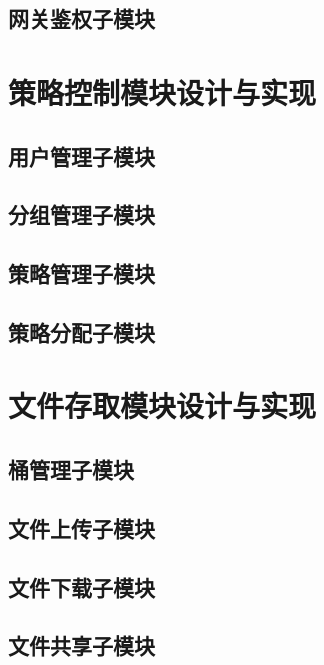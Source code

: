 \subsection{网关鉴权子模块}





\section{策略控制模块设计与实现}

\subsection{用户管理子模块}

\subsection{分组管理子模块}

\subsection{策略管理子模块}

\subsection{策略分配子模块}





\section{文件存取模块设计与实现}

\subsection{桶管理子模块}

\subsection{文件上传子模块}

\subsection{文件下载子模块}

\subsection{文件共享子模块}






